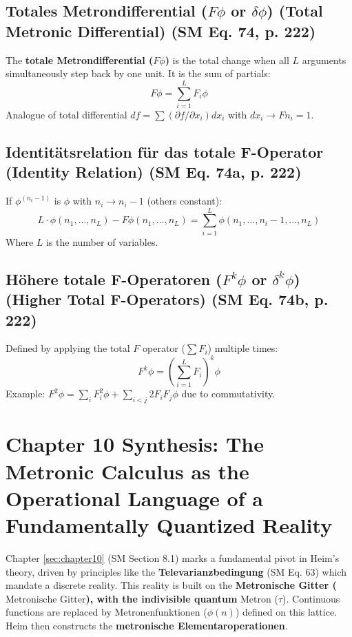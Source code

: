 \documentclass[
    12pt,              %
    a4paper,           %
    headings=normal,   %
    twoside=true,      %
    BCOR=8mm,          %
]{scrbook}
\newcommand{\metron}{\tau}
\newcommand{\metronischegitter}{\text{Metronische Gitter}}
\newcommand{\metronenfunktion}{\phi(n)}
\begin{document}
\subsection{Totales Metrondifferential (\(F\phi\) or \(\delta\phi\)) (Total Metronic Differential) (SM Eq. 74, p. 222)}
\label{sec:ch10_4_3_total_metrondiff}
The \textbf{totale Metrondifferential (\(F\phi\))} is the total change when all \(L\) arguments simultaneously step back by one unit. It is the sum of partials:
\begin{equation} \label{eq:original_total_metrondifferential} %
F\phi = \sum_{i=1}^L F_i\phi
\end{equation}
Analogue of total differential \(df = \sum (\partial f/\partial x_i)dx_i\) with \(dx_i \to Fn_i=1\).

\subsection{Identitätsrelation für das totale F-Operator (Identity Relation) (SM Eq. 74a, p. 222)}
\label{sec:ch10_4_4_identity_relation_total_f}
If \(\phi^{(n_i-1)}\) is \(\phi\) with \(n_i \to n_i-1\) (others constant):
\[ L \cdot \phi(n_1, \dots, n_L) - F\phi(n_1, \dots, n_L) = \sum_{i=1}^L \phi(n_1, \dots, n_i-1, \dots, n_L) \]
Where \(L\) is the number of variables.

\subsection{Höhere totale F-Operatoren (\(F^k\phi\) or \(\delta^k\phi\)) (Higher Total F-Operators) (SM Eq. 74b, p. 222)}
\label{sec:ch10_4_5_higher_total_f}
Defined by applying the total \(F\) operator (\(\sum F_i\)) multiple times:
\[ F^k\phi = \left(\sum_{i=1}^L F_i\right)^k \phi \]
Example: \(F^2\phi = \sum_i F_i^2\phi + \sum_{i<j} 2F_iF_j\phi \) due to commutativity.

\section{Chapter 10 Synthesis: The Metronic Calculus as the Operational Language of a Fundamentally Quantized Reality}
\label{sec:ch10_5_synthesis}

Chapter \ref{sec:chapter10} (SM Section 8.1) marks a fundamental pivot in Heim's theory, driven by principles like the \textbf{Televarianzbedingung} (SM Eq. 63) which mandate a discrete reality. This reality is built on the \textbf{Metronische Gitter (\(\metronischegitter\)), with the indivisible quantum }Metron (\(\metron\)). Continuous functions are replaced by Metronenfunktionen (\(\metronenfunktion\)) defined on this lattice. Heim then constructs the \textbf{metronische Elementaroperationen}.
\end{document}
